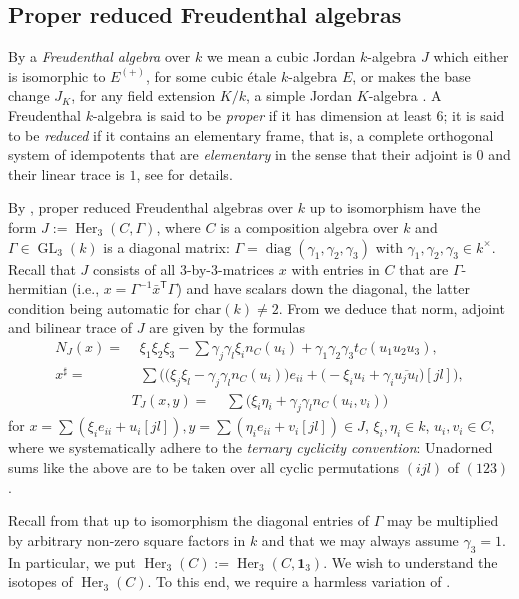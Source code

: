\documentclass{amsart}
\theoremstyle{definition} %
\theoremstyle{remark} %
\DeclareMathOperator{\diag}{diag}
\newcommand{\Eins}{\mathrm{\mathbf{1}}}
\newcommand{\trans}{\mathsf{T}}
\renewcommand{\:}{\colon\,}
\DeclareMathOperator{\Her}{Her}
\DeclareMathOperator{\GL}{GL}
\numberwithin{equation}{section}
\begin{document}
\subsection{Proper reduced Freudenthal algebras} \label{ss.SIREFR} By a \emph{Freudenthal algebra} over $k$ we mean a cubic Jordan $k$-algebra $J$ which either is isomorphic to $E^{(+)}$, for some cubic \'etale $k$-algebra $E$, or makes the base change $J_K$, for any field extension $K/k$, a simple Jordan $K$-algebra \cite[34.17, 39.8]{MR4806163}. A Freudenthal $k$-algebra is said to be \emph{proper} if it has dimension at least $6$; it is said to be \emph{reduced} if it contains an elementary frame, that is, a complete orthogonal system of idempotents that are \emph{elementary} in the sense that their adjoint is $0$ and their linear trace is $1$, see \cite[\S37]{MR4806163} for details.

By \cite[41.1]{MR4806163}, proper reduced Freudenthal algebras over $k$ up to isomorphism have the form $J := \Her_3(C,\Gamma)$, where $C$ is a composition algebra over $k$ and $\Gamma \in \GL_3(k)$ is a diagonal matrix: $\Gamma = \diag(\gamma_1,\gamma_2,\gamma_3)$ with $\gamma_1,\gamma_2,\gamma_3 \in k^\times$. Recall that $J$ consists of all $3$-by-$3$-matrices $x$ with entries in $C$ that are $\Gamma$-hermitian (i.e., $x = \Gamma^{-1}\bar x^\trans \Gamma$) and have scalars down the diagonal, the latter condition being automatic for $\mathrm{char}(k) \neq 2$. From \cite[36.4]{MR4806163} we deduce that norm, adjoint and bilinear trace of $J$ are given by the formulas
\begin{align*}
N_J(x) =\,\,&\xi_1\xi_2\xi_3 - \sum\gamma_j\gamma_l\xi_in_C(u_i) + \gamma_1\gamma_2\gamma_3t_C(u_1u_2u_3), \\
x^\sharp =\,\,&\sum\Big(\big(\xi_j\xi_l - \gamma_j\gamma_ln_C(u_i)\big)e_{ii} + \big(-\xi_iu_i + \gamma_i\overline{u_ju_l}\big)[jl]\big), 
\end{align*}
\begin{align}
\label{REDBLT} T_J(x,y) =\,\,&\sum\big(\xi_i\eta_i + \gamma_j\gamma_ln_C(u_i,v_i)\big)
\end{align}
for $x = \sum(\xi_ie_{ii} + u_i[jl]), y = \sum(\eta_ie_{ii} + v_i[jl]) \in J$, $\xi_i,\eta_i \in k$, $u_i,v_i \in C$, where we systematically adhere to the \emph{ternary cyclicity convention}: Unadorned sums like the above are to be taken over all cyclic permutations $(ijl)$ of $(123)$.

Recall from \cite[Exc.~37.22~(b)]{MR4806163} that up to isomorphism the diagonal entries of $\Gamma$ may be multiplied by arbitrary non-zero square factors in $k$ and that we may always assume $\gamma_3 = 1$. In particular, we put $\Her_3(C) := \Her_3(C,\Eins_3)$. We wish to understand the isotopes of $\Her_3(C)$. To this end, we require a harmless variation of \cite[Exc.~37.23]{MR4806163}.
\end{document}
